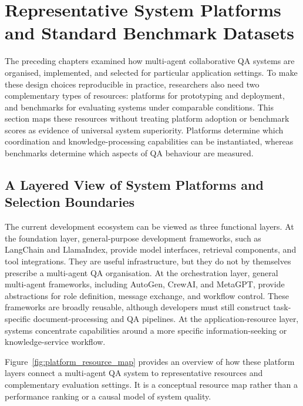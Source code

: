 \section{Representative System Platforms and Standard Benchmark Datasets}
\label{sec:platform_benchmarks}

The preceding chapters examined how multi-agent collaborative QA systems are
organised, implemented, and selected for particular application settings. To
make these design choices reproducible in practice, researchers also need two
complementary types of resources: platforms for prototyping and deployment,
and benchmarks for evaluating systems under comparable conditions. This
section maps these resources without treating platform adoption or benchmark
scores as evidence of universal system superiority. Platforms determine which
coordination and knowledge-processing capabilities can be instantiated,
whereas benchmarks determine which aspects of QA behaviour are measured.

\subsection{A Layered View of System Platforms and Selection Boundaries}
\label{sec:platform_layers}

The current development ecosystem can be viewed as three functional layers.
At the foundation layer, general-purpose development frameworks, such as
LangChain and LlamaIndex, provide model interfaces, retrieval components, and
tool integrations. They are useful infrastructure, but they do not by
themselves prescribe a multi-agent QA organisation. At the orchestration
layer, general multi-agent frameworks, including AutoGen, CrewAI, and MetaGPT,
provide abstractions for role definition, message exchange, and workflow
control. These frameworks are broadly reusable, although developers must
still construct task-specific document-processing and QA pipelines. At the
application-resource layer, systems concentrate capabilities around a more
specific information-seeking or knowledge-service workflow.

Figure~\ref{fig:platform_resource_map} provides an overview of how these
platform layers connect a multi-agent QA system to representative resources
and complementary evaluation settings. It is a conceptual resource map rather
than a performance ranking or a causal model of system quality.

